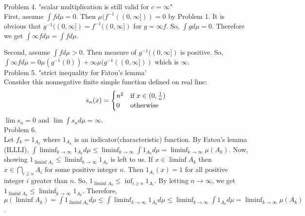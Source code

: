 Problem 4. "scalar multiplication is still valid for $c = \infty$" \\

First, assume $\int f d\mu = 0$. Then $\mu(f^{-1}((0, \infty])) = 0$ by Problem 1.
It is obvious that $g^{-1}((0, \infty]) = f^{-1}((0, \infty])$ for $g = \infty f$.
So, $\int g d\mu = 0$. Therefore we get $\int \infty f d\mu = \int f d\mu$.

Second, assume $\int f d\mu > 0$. Then measure of $g ^ {-1} ((0, \infty ])$ is positive.
So, $\int \infty f d \mu = 0 \mu ( g ^ {-1} (0)) + \infty \mu(g^{-1}((0, \infty]))$ which is $\infty$.\\

Problem 5. "strict inequality for Fatou's lemma'\\

Consider this nonnegative finite simple function defined on real line:
\begin{equation*}
    s_n(x) = \begin{cases}
        n^2 & \text{if } x \in (0, {1 \over n}) \\
        0 & \text{otherwise}
    \end{cases}
\end{equation*}
$\lim s_n = 0$ and $\lim \int s_n d\mu = \infty$.\\

Problem 6.\\

Let $f_k = 1_{A_k}$ where $1_{A_k}$ is an indicator(characteristic) function.
By Fatou's lemma (ILLLI), $\int \liminf_{k \rightarrow \infty} 1_{A_k} d\mu \leq \liminf_{k \rightarrow \infty} \int 1_{A_k}d\mu = \liminf_{k \rightarrow \infty} \mu(A_k)$.
Now, showing $1_{\liminf A_k} \leq \liminf_{k\rightarrow \infty}1_{A_k}$ is left to us.
If $x \in \liminf A_k$ then $x \in \bigcap_{i\geq n} A_i$ for some positive integer $n$.
Then $1_{A_i}(x) = 1$ for all positive integer $i$ greater than $n$. So, $1_{\liminf A_k} \leq \inf_{i\geq n} 1_{A_i}$.
By letting $n \rightarrow \infty$, we get $1_{\liminf A_k} \leq \liminf_{k\rightarrow \infty}1_{A_k}$.
Therefore, $\mu(\liminf A_k) = \int 1_{\liminf A_k}d\mu \leq \int \liminf_{k \rightarrow \infty} 1_{A_k} d\mu \leq \liminf_{k \rightarrow \infty} \int 1_{A_k}d\mu = \liminf_{k \rightarrow \infty} \mu(A_k)$.\\
